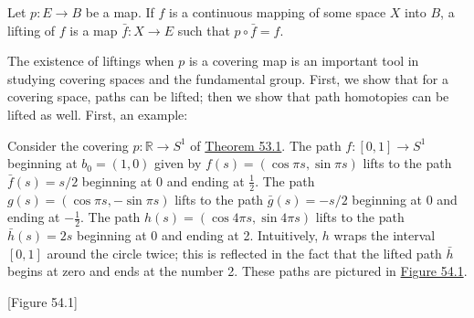 \begin{definition}
Let \(p : E \rightarrow B\) be a map. If \(f\) is a continuous mapping of some space \(X\) into \(B\), a lifting of \(f\) is a map \(\bar{f} : X \rightarrow E\) such that \(p \circ \bar{f} = f\).
\end{definition}

\par\nopagebreak
\begin{center}
	\label{fig:com_54_0}
\end{center}
\par\nopagebreak

The existence of liftings when \(p\) is a covering map is an important tool in studying covering spaces and the fundamental group. First, we show that for a covering space, paths can be lifted; then we show that path homotopies can be lifted as well. First, an example:

\begin{centeredblock}
\begin{example}
\label{ex:\thesection.\theexample}
Consider the covering \(p : \mathbb{R} \rightarrow {S}^{1}\) of \hyperref[thm:53.1]{Theorem 53.1}. The path \(f : [ {0,1}] \rightarrow {S}^{1}\) beginning at \(b_{0} = ( {1,0})\) given by \(f( s) = ( {\cos {\pi s},\sin {\pi s}})\) lifts to the path \(\bar{f}( s) = s/2\) beginning at 0 and ending at \(\frac{1}{2}\). The path \(g( s) = ( {\cos {\pi s}, - \sin {\pi s}})\) lifts to the path \(\bar{g}( s) = - s/2\) beginning at 0 and ending at \(- \frac{1}{2}\). The path \(h( s) = ( {\cos {4\pi s},\sin {4\pi s}})\) lifts to the path \(\bar{h}( s) = {2s}\) beginning at 0 and ending at 2. Intuitively, \(h\) wraps the interval \([ {0,1}]\) around the circle twice; this is reflected in the fact that the lifted path \(\bar{h}\) begins at zero and ends at the number 2. These paths are pictured in \hyperref[fig:54.1]{Figure 54.1}.

[Figure 54.1]
\end{example}
\end{centeredblock}

